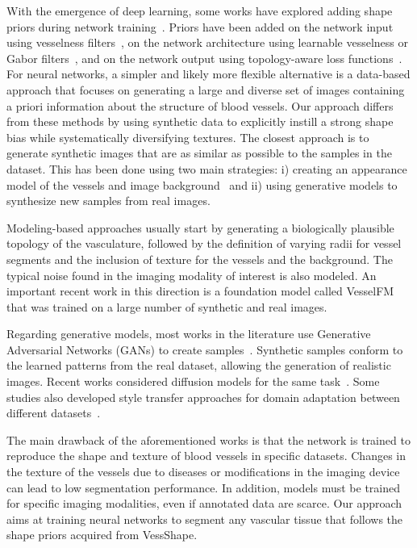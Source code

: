 \documentclass[%
reprint,
nofootinbib,
 amsmath,amssymb,
aps,
superscriptaddress,
showkeys,
longbibliography
]{revtex4-1}
\begin{document}
With the emergence of deep learning, some works have explored adding shape priors during network training~\cite{bohlender2021survey}. Priors have been added on the network input using vesselness filters~\cite{affane2022robust,hu2024domain,garret2024deep}, on the network architecture using learnable vesselness or Gabor filters~\cite{chen2023learnable,fu2018frangi,volkov2025modification}, and on the network output using topology-aware loss functions~\cite{shit2021cldice,hu2019topology,berger2024topologically}. For neural networks, a simpler and likely more flexible alternative is a data-based approach that focuses on generating a large and diverse set of images containing a priori information about the structure of blood vessels. Our approach differs from these methods by using synthetic data to explicitly instill a strong shape bias while systematically diversifying textures. The closest approach is to generate synthetic images that are as similar as possible to the samples in the dataset. This has been done using two main strategies: i) creating an appearance model of the vessels and image background~\cite{tetteh2020deepvesselnet,wittmann2025vesselfm,wittmann2024simulation,mathys2025synthetic} and ii) using generative models to synthesize new samples from real images.

Modeling-based approaches usually start by generating a biologically plausible topology of the vasculature, followed by the definition of varying radii for vessel segments and the inclusion of texture for the vessels and the background. The typical noise found in the imaging modality of interest is also modeled. An important recent work in this direction is a foundation model called VesselFM~\cite{wittmann2025vesselfm} that was trained on a large number of synthetic and real images.

Regarding generative models, most works in the literature use Generative Adversarial Networks (GANs) to create samples~\cite{you2022application,andreini2021two,tavakkoli2020novel,costa2017end}. Synthetic samples conform to the learned patterns from the real dataset, allowing the generation of realistic images. Recent works considered diffusion models for the same task~\cite{go2024generation,guo2025vesseldiffusion,wang2025vastsd}. Some studies also developed style transfer approaches for domain adaptation between different datasets~\cite{peng2022unsupervised,chen2023segmentation,chen2021real}.

The main drawback of the aforementioned works is that the network is trained to reproduce the shape and texture of blood vessels in specific datasets. Changes in the texture of the vessels due to diseases or modifications in the imaging device can lead to low segmentation performance. In addition, models must be trained for specific imaging modalities, even if annotated data are scarce. Our approach aims at training neural networks to segment any vascular tissue that follows the shape priors acquired from VessShape.
\end{document}
